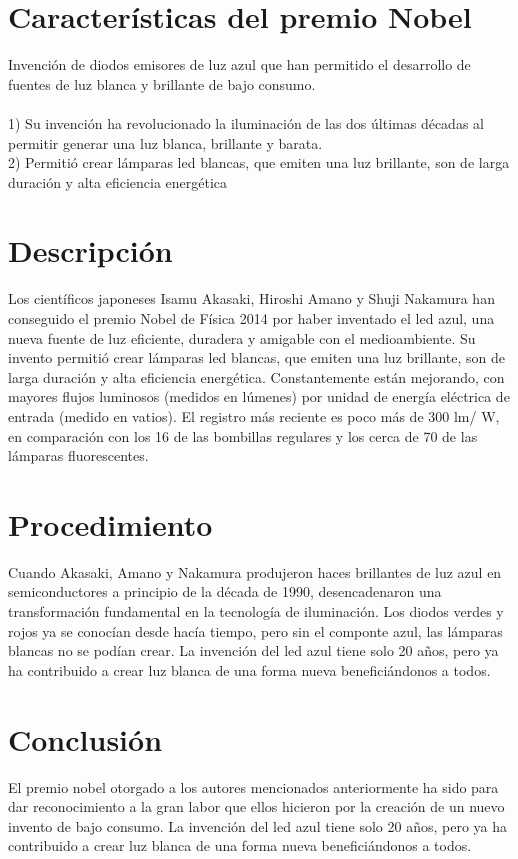 \documentclass{article}
\begin{document}
\section{Características del premio Nobel}
Invención de diodos emisores de luz azul que han permitido el desarrollo de fuentes de luz blanca y brillante de bajo consumo.\\\\
1) Su invención ha revolucionado la iluminación de las dos últimas décadas al permitir generar una luz blanca, brillante y barata.\\
2) Permitió crear lámparas led blancas, que emiten una luz brillante, son de larga duración y alta eficiencia energética
\section{Descripción}
Los científicos japoneses Isamu Akasaki, Hiroshi Amano y Shuji Nakamura han conseguido el premio Nobel de Física 2014 por haber inventado el led azul, una nueva fuente de luz eficiente, duradera y amigable con el medioambiente. 
Su invento permitió crear lámparas led blancas, que emiten una luz brillante, son de larga duración y alta eficiencia energética. Constantemente están mejorando, con mayores flujos luminosos (medidos en lúmenes) por unidad de energía eléctrica de entrada (medido en vatios). El registro más reciente es poco más de 300 lm/ W, en comparación con los 16 de las bombillas regulares y los cerca de 70 de las lámparas fluorescentes.
\section{Procedimiento}
Cuando Akasaki, Amano y Nakamura produjeron haces brillantes de luz azul en semiconductores a principio de la década de 1990, desencadenaron una transformación fundamental en la tecnología de iluminación. Los diodos verdes y rojos ya se conocían desde hacía tiempo, pero sin el componte azul, las lámparas blancas no se podían crear. La invención del led azul tiene solo 20 años, pero ya ha contribuido a crear luz blanca de una forma nueva beneficiándonos a todos.

\section{Conclusión}
El premio nobel otorgado a los autores mencionados anteriormente ha sido para dar reconocimiento a la gran labor que ellos hicieron por la creación de un nuevo invento de bajo consumo. La invención del led azul tiene solo 20 años, pero ya ha contribuido a crear luz blanca de una forma nueva beneficiándonos a todos.
\end{document}
